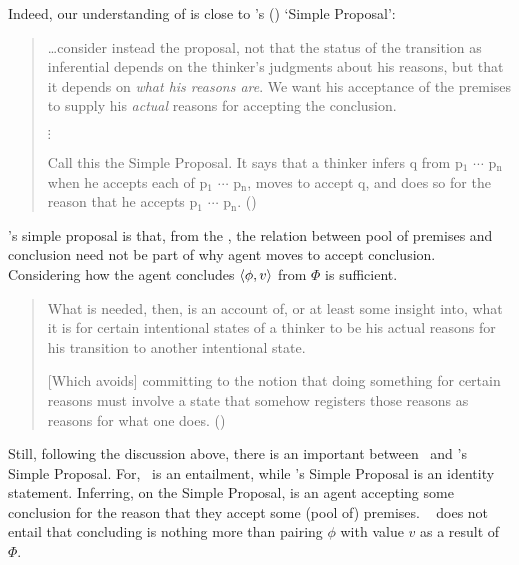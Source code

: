 \begin{note}
  Indeed, our understanding of \support{} is close to \citeauthor{Wright:2014tt}'s (\citeyear{Wright:2014tt}) `Simple Proposal':
  \begin{quote}
    \dots consider instead the proposal, not that the status of the transition as inferential depends on the thinker's judgments about his reasons, but that it depends on \emph{what his reasons are}.
    We want his acceptance of the premises to supply his \emph{actual} reasons for accepting the conclusion.

    \mbox{}\hfill\(\vdots\)\hfill\mbox{}

    Call this the Simple Proposal.
    It says that a thinker infers q from p\(_{1}\) \(\cdots\) p\(_{\text{n}}\) when he accepts each of p\(_{1}\) \(\cdots\) p\(_{\text{n}}\), moves to accept q, and does so for the reason that he accepts p\(_{1}\) \(\cdots\) p\(_{\text{n}}\).%
    \mbox{}\hfill\mbox{(\citeyear[33]{Wright:2014tt})}
  \end{quote}

  \citeauthor{Wright:2014tt}'s simple proposal is that, from the \agpe{}, the relation between pool of premises and conclusion need not be part of why agent moves to accept conclusion.
  Considering how the agent concludes \(\langle \phi, v \rangle\) from \(\Phi\) is sufficient.

  \begin{quote}
      What is needed, then, is an account of, or at least some insight into, what it is for certain intentional states of a thinker to be his actual reasons for his transition to another intentional state.

      [Which avoids] committing to the notion that doing something for certain reasons must involve a state that somehow registers those reasons as reasons for what one does.%
      \mbox{}\hfill\mbox{(\citeyear[34]{Wright:2014tt})}
    \end{quote}

  Still, following the discussion above, there is an important between~\supportI{} and \citeauthor{Wright:2014tt}'s Simple Proposal.
  For,~\supportI{} is an entailment, while \citeauthor{Wright:2014tt}'s Simple Proposal is an identity statement.
  Inferring, on the Simple Proposal, is an agent accepting some conclusion for the reason that they accept some (pool of) premises.
 ~\supportI{} does not entail that concluding is nothing more than pairing \(\phi\) with value \(v\) as a result of \(\Phi\).
\end{note}


